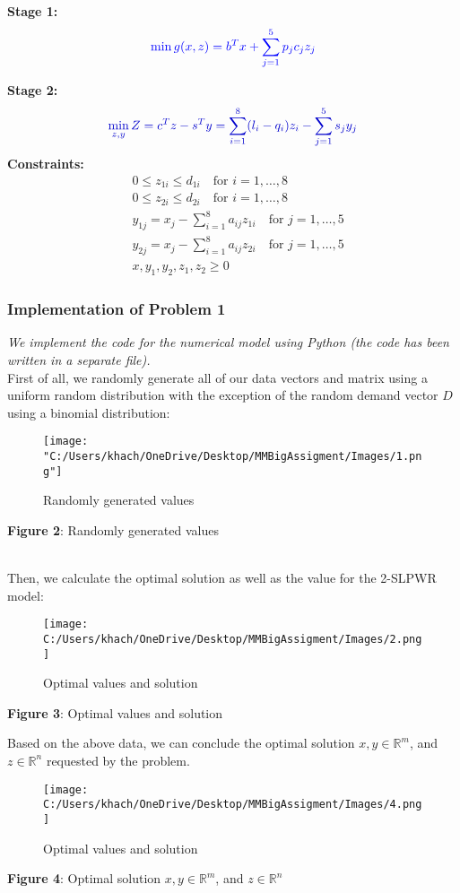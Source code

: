 \documentclass[a4paper]{article}
\begin{document}
		\textbf{Stage 1:}
		\[
		\textcolor{blue}{ \min g(x,z) = b^T x +  \sum_{j=1}^{5} p_j c_j z_j}
		\]
		
		\textbf{Stage 2:}
		\[
		\textcolor{blue!80!black}{ \min_{z,y}Z = c^T z - s^T y = \sum_{i=1}^{8} (l_i - q_i)z_i - \sum_{j=1}^{5} s_j y_j}
		\]
		\textbf{Constraints:}
		\begin{align*}
			& 0 \leq z_{1i} \leq d_{1i} \quad \text{for } i=1, \ldots, 8 \\
			& 0 \leq z_{2i} \leq d_{2i} \quad \text{for } i=1, \ldots, 8 \\
			& y_{1j} = x_j - \sum_{i=1}^{8} a_{ij}z_{1i} \quad \text{for } j=1, \ldots, 5 \\
			& y_{2j} = x_j - \sum_{i=1}^{8} a_{ij}z_{2i} \quad \text{for } j=1, \ldots, 5 \\
			& x, y_1, y_2, z_1, z_2 \geq 0
		\end{align*}
		\subsubsection{Implementation of Problem 1}
		\emph{We implement the code for the numerical model using Python (the code has been written in a separate file).}\\
		First of all, we randomly generate all of our data vectors and matrix using a uniform random distribution with the exception of the random demand vector \(D\) using a binomial distribution:
		\newpage
		\begin{figure}[htbp]
			\centering
			\texttt{[image: "C:/Users/khach/OneDrive/Desktop/MMBigAssigment/Images/1.png"]}
			\caption{Randomly generated values}
			\label{fig:Randomly generated values}
		\end{figure}
		\begin{center}
			\textbf{Figure 2}: Randomly generated values
		\end{center}
		\\
		Then, we calculate the optimal solution as well as the value for the 2-SLPWR model:
		\begin{figure}[htbp]
			\centering
			\texttt{[image: C:/Users/khach/OneDrive/Desktop/MMBigAssigment/Images/2.png]}
			\captionsetup{justification=centering}
			\caption{Optimal values and solution}
			\label{fig:Optimal values and solution}
		\end{figure}
		\begin{center}
			\textbf{Figure 3}: Optimal values and solution
		\end{center}
		Based on the above data, we can conclude the optimal solution \(x, y \in \mathbb{R}^m\), and \(z \in \mathbb{R}^n\) requested by the problem.
		\begin{figure}[htbp]
			\centering
			\texttt{[image: C:/Users/khach/OneDrive/Desktop/MMBigAssigment/Images/4.png]}
			\caption{Optimal values and solution}
			\label{fig:Optimal solution x,y...}
		\end{figure}
		\begin{center}
			\textbf{Figure 4}: Optimal solution \(x, y \in \mathbb{R}^m\), and \(z \in \mathbb{R}^n\)
		\end{center}
		\\
		
\end{document}
